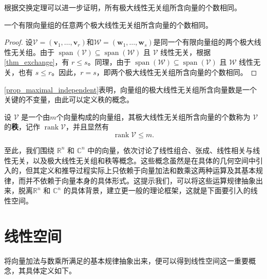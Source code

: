 根据交换定理可以进一步证明，所有极大线性无关组所含向量的个数相同。
\begin{proposition}\label{prop_maximal_independent}
    一个有限向量组的任意两个极大线性无关组所含向量的个数相同。
\end{proposition}

\begin{proof}
    设\( \mathcal V=(\bm v_1,\ldots,\bm v_r) \)和\( \mathcal W=(\bm w_1,\ldots,\bm w_s) \)是同一个有限向量组的两个极大线性无关组。由于 \( \operatorname{span}(\mathcal{V}) \subseteq \operatorname{span}(\mathcal{W}) \) 且 \(\mathcal V\) 线性无关，根据\cref{thm_exchange}，有 \(r\leq s\)。同理，由于 \( \operatorname{span}(\mathcal{W}) \subseteq \operatorname{span}(\mathcal{V}) \) 且 \(\mathcal W\) 线性无关，也有 \(s\leq r\)。因此，\(r=s\)，即两个极大线性无关组所含向量的个数相同。
\end{proof}

\cref{prop_maximal_independent}表明，向量组的极大线性无关组所含向量数是一个关键的不变量，由此可以定义秩的概念。
\begin{definition}[秩]
    设 \(\mathcal V\) 是一个由\( m \)个向量构成的向量组，其极大线性无关组所含向量的个数称为 \(\mathcal V\) 的\textbf{秩}，记作 \(\operatorname{rank}\mathcal V\)，并且显然有
    \[
        \operatorname{rank}\mathcal V\leq m.
    \]
\end{definition}

至此，我们围绕 \(\mathbb R^n\) 和 \(\mathbb C^n\) 中的向量，依次讨论了线性组合、张成、线性相关与线性无关，以及极大线性无关组和秩等概念。这些概念虽然是在具体的几何空间中引入的，但其定义和推导过程实际上只依赖于向量加法和数乘这两种运算及其基本规律，而并不依赖于向量本身的具体形式。这提示我们，可以将这些运算规律抽象出来，脱离\(\mathbb R^n\) 和 \(\mathbb C^n\) 的具体背景，建立更一般的理论框架，这就是下面要引入的线性空间。

\section{线性空间}
\label{sec_basis_dim_coord}

将向量加法与数乘所满足的基本规律抽象出来，便可以得到线性空间这一重要概念，其具体定义如下。

